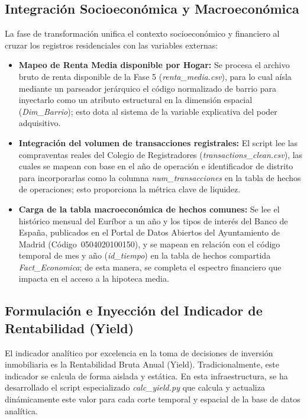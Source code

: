 \documentclass[a4paper,11pt,openany]{book}
\begin{document}
\subsection{Integración Socioeconómica y Macroeconómica}
La fase de transformación unifica el contexto socioeconómico y financiero al cruzar los registros residenciales con las variables externas:
\begin{itemize}
    \item \textbf{Mapeo de Renta Media disponible por Hogar:} Se procesa el archivo bruto de renta disponible de la Fase 5 (\textit{renta\_media.csv}), para lo cual aísla mediante un parseador jerárquico el código normalizado de barrio para inyectarlo como un atributo estructural en la dimensión espacial (\textit{Dim\_Barrio}); esto dota al sistema de la variable explicativa del poder adquisitivo.
    \item \textbf{Integración del volumen de transacciones registrales:} El script lee las compraventas reales del Colegio de Registradores (\textit{transactions\_clean.csv}), las cuales se mapean con base en el año de operación e identificador de distrito para incorporarlas como la columna \textit{num\_transacciones} en la tabla de hechos de operaciones; esto proporciona la métrica clave de liquidez.
    \item \textbf{Carga de la tabla macroeconómica de hechos comunes:} Se lee el histórico mensual del Euríbor a un año y los tipos de interés del Banco de España, publicados en el Portal de Datos Abiertos del Ayuntamiento de Madrid (Código~0504020100150), y se mapean en relación con el código temporal de mes y año (\textit{id\_tiempo}) en la tabla de hechos compartida \textit{Fact\_Economica}; de esta manera, se completa el espectro financiero que impacta en el acceso a la hipoteca media.
\end{itemize}

\subsection{Formulación e Inyección del Indicador de Rentabilidad (Yield)}
El indicador analítico por excelencia en la toma de decisiones de inversión inmobiliaria es la Rentabilidad Bruta Anual (Yield). Tradicionalmente, este indicador se calcula de forma aislada y estática. En esta infraestructura, se ha desarrollado el script especializado \textit{calc\_yield.py} que calcula y actualiza dinámicamente este valor para cada corte temporal y espacial de la base de datos analítica.
\end{document}
